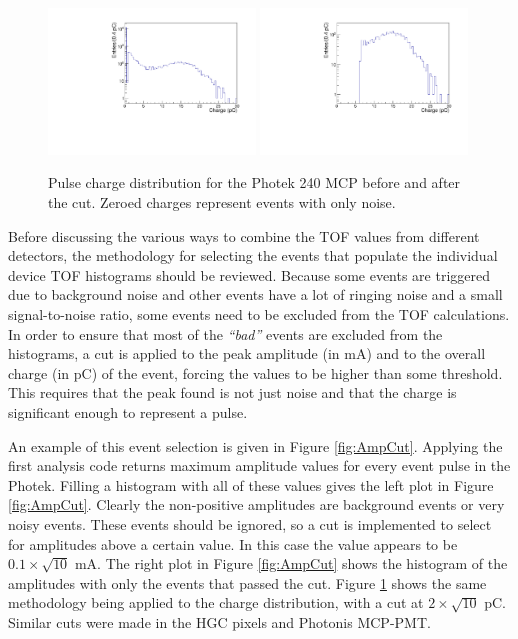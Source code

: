 \documentclass[twocolumn,aps,prd,reprint,superscriptaddress,floatfix]{revtex4-1}
\begin{document}
\begin{figure}[!htb]
\centering
	\includegraphics[width=0.49\textwidth]{PhotekCharge.pdf}
	\includegraphics[width=0.49\textwidth]{PhotekChargeCut.pdf}
	\caption{Pulse charge distribution for the Photek 240 MCP before and after the cut.
		Zeroed charges represent events with only noise.}
	\label{fig:ChargeCut}
\end{figure}

Before discussing the various ways to combine the TOF values from different detectors, the methodology for selecting the events that populate the individual device TOF histograms should be reviewed.
Because some events are triggered due to background noise and other events have a lot of ringing noise and a small signal-to-noise ratio, some events need to be excluded from the TOF calculations. 
In order to ensure that most of the \textit{``bad''} events are excluded from the histograms, a cut is applied to the peak amplitude (in mA) and to the overall charge (in pC) of the event, forcing the values to be higher than some threshold. 
This requires that the peak found is not just noise and that the charge is significant enough to represent a pulse.

An example of this event selection is given in Figure \ref{fig:AmpCut}.
Applying the first analysis code returns maximum amplitude values for every event pulse in the Photek. 
Filling a histogram with all of these values gives the left plot in Figure \ref{fig:AmpCut}.
Clearly the non-positive amplitudes are background events or very noisy events. 
These events should be ignored, so a cut is implemented to select for amplitudes above a certain value. 
In this case the value appears to be $0.1\times\sqrt{10}$ mA. 
The right plot in Figure \ref{fig:AmpCut} shows the histogram of the amplitudes with only the events that passed the cut. 
Figure \ref{fig:ChargeCut} shows the same methodology being applied to the charge distribution, with a cut at $2\times\sqrt{10}$ pC. 
Similar cuts were made in the HGC pixels and Photonis MCP-PMT. 
\end{document}
